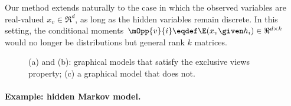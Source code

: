 Our method extends naturally to the case in which the observed variables
  are real-valued $x_v \in \Re^d$, as long as the hidden variables remain discrete. 
In this setting, the conditional moments
  $\mOpp{v}{i} \eqdef \E(x_v \given h_i) \in \Re^{d \times k}$
  would no longer be distributions but general rank $k$ matrices.

\begin{figure}
  \centering
  \caption{(a) and (b): graphical models that satisfy the exclusive views property;
  (c) a graphical model that does not.}
  \label{fig:examples}
\end{figure}


\paragraph{Example: hidden Markov model.}

